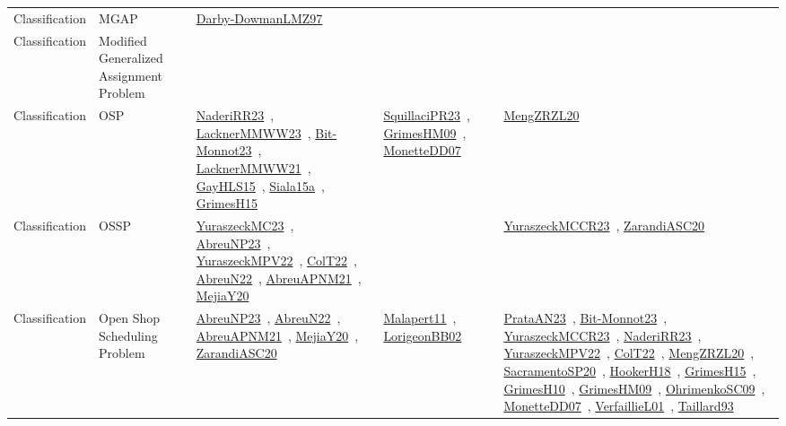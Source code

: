 {\begin{longtable}{lp{3cm}>{\raggedright\arraybackslash}p{6cm}>{\raggedright\arraybackslash}p{6cm}>{\raggedright\arraybackslash}p{8cm}}
Classification & MGAP & \href{works/Darby-DowmanLMZ97.pdf}{Darby-DowmanLMZ97}~\cite{Darby-DowmanLMZ97} &  & \\
Classification & Modified Generalized Assignment Problem &  &  & \\
Classification & OSP & \href{works/NaderiRR23.pdf}{NaderiRR23}~\cite{NaderiRR23}, \href{works/LacknerMMWW23.pdf}{LacknerMMWW23}~\cite{LacknerMMWW23}, \href{works/Bit-Monnot23.pdf}{Bit-Monnot23}~\cite{Bit-Monnot23}, \href{works/LacknerMMWW21.pdf}{LacknerMMWW21}~\cite{LacknerMMWW21}, \href{works/GayHLS15.pdf}{GayHLS15}~\cite{GayHLS15}, \href{works/Siala15a.pdf}{Siala15a}~\cite{Siala15a}, \href{works/GrimesH15.pdf}{GrimesH15}~\cite{GrimesH15} & \href{works/SquillaciPR23.pdf}{SquillaciPR23}~\cite{SquillaciPR23}, \href{works/GrimesHM09.pdf}{GrimesHM09}~\cite{GrimesHM09}, \href{works/MonetteDD07.pdf}{MonetteDD07}~\cite{MonetteDD07} & \href{works/MengZRZL20.pdf}{MengZRZL20}~\cite{MengZRZL20}\\
Classification & OSSP & \href{works/YuraszeckMC23.pdf}{YuraszeckMC23}~\cite{YuraszeckMC23}, \href{works/AbreuNP23.pdf}{AbreuNP23}~\cite{AbreuNP23}, \href{works/YuraszeckMPV22.pdf}{YuraszeckMPV22}~\cite{YuraszeckMPV22}, \href{works/ColT22.pdf}{ColT22}~\cite{ColT22}, \href{works/AbreuN22.pdf}{AbreuN22}~\cite{AbreuN22}, \href{works/AbreuAPNM21.pdf}{AbreuAPNM21}~\cite{AbreuAPNM21}, \href{works/MejiaY20.pdf}{MejiaY20}~\cite{MejiaY20} &  & \href{works/YuraszeckMCCR23.pdf}{YuraszeckMCCR23}~\cite{YuraszeckMCCR23}, \href{works/ZarandiASC20.pdf}{ZarandiASC20}~\cite{ZarandiASC20}\\
Classification & Open Shop Scheduling Problem & \href{works/AbreuNP23.pdf}{AbreuNP23}~\cite{AbreuNP23}, \href{works/AbreuN22.pdf}{AbreuN22}~\cite{AbreuN22}, \href{works/AbreuAPNM21.pdf}{AbreuAPNM21}~\cite{AbreuAPNM21}, \href{works/MejiaY20.pdf}{MejiaY20}~\cite{MejiaY20}, \href{works/ZarandiASC20.pdf}{ZarandiASC20}~\cite{ZarandiASC20} & \href{works/Malapert11.pdf}{Malapert11}~\cite{Malapert11}, \href{works/LorigeonBB02.pdf}{LorigeonBB02}~\cite{LorigeonBB02} & \href{works/PrataAN23.pdf}{PrataAN23}~\cite{PrataAN23}, \href{works/Bit-Monnot23.pdf}{Bit-Monnot23}~\cite{Bit-Monnot23}, \href{works/YuraszeckMCCR23.pdf}{YuraszeckMCCR23}~\cite{YuraszeckMCCR23}, \href{works/NaderiRR23.pdf}{NaderiRR23}~\cite{NaderiRR23}, \href{works/YuraszeckMPV22.pdf}{YuraszeckMPV22}~\cite{YuraszeckMPV22}, \href{works/ColT22.pdf}{ColT22}~\cite{ColT22}, \href{works/MengZRZL20.pdf}{MengZRZL20}~\cite{MengZRZL20}, \href{works/SacramentoSP20.pdf}{SacramentoSP20}~\cite{SacramentoSP20}, \href{works/HookerH18.pdf}{HookerH18}~\cite{HookerH18}, \href{works/GrimesH15.pdf}{GrimesH15}~\cite{GrimesH15}, \href{works/GrimesH10.pdf}{GrimesH10}~\cite{GrimesH10}, \href{works/GrimesHM09.pdf}{GrimesHM09}~\cite{GrimesHM09}, \href{works/OhrimenkoSC09.pdf}{OhrimenkoSC09}~\cite{OhrimenkoSC09}, \href{works/MonetteDD07.pdf}{MonetteDD07}~\cite{MonetteDD07}, \href{works/VerfaillieL01.pdf}{VerfaillieL01}~\cite{VerfaillieL01}, \href{works/Taillard93.pdf}{Taillard93}~\cite{Taillard93}\\

\end{longtable}}

